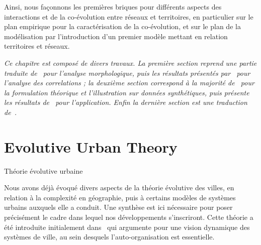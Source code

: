 Ainsi, nous façonnons les premières briques pour différents aspects des interactions et de la co-évolution entre réseaux et territoires, en particulier sur le plan empirique pour la caractérisation de la co-évolution, et sur le plan de la modélisation par l'introduction d'un premier modèle mettant en relation territoires et réseaux.






\stars


\textit{Ce chapitre est composé de divers travaux. La première section reprend une partie traduite de~\cite{raimbault2017calibration} pour l'analyse morphologique, puis les résultats présentés par~\cite{raimbault2016cautious} pour l'analyse des correlations ; la deuxième section correspond à la majorité de~\cite{raimbault2017identification} pour la formulation théorique et l'illustration sur données synthétiques, puis présente les résultats de~\cite{raimbault:halshs-01584914} pour l'application. Enfin la dernière section est une traduction de~\cite{raimbault2017indirect}.}





\newpage


\section*{Evolutive Urban Theory}{Théorie évolutive urbaine}



Nous avons déjà évoqué divers aspects de la théorie évolutive des villes, en relation à la complexité en géographie, puis à certains modèles de systèmes urbains auxquels elle a conduit. Une synthèse est ici nécessaire pour poser précisément le cadre dans lequel nos développements s'inscriront. Cette théorie a été introduite initialement dans~\cite{pumain1997pour} qui argumente pour une vision dynamique des systèmes de ville, au sein desquels l'auto-organisation est essentielle.


